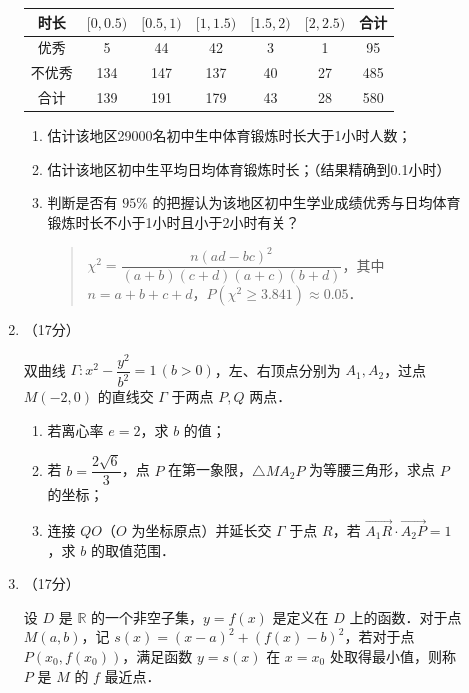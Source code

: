 \begin{description}
\begin{enumerate}[leftmargin=5pt]
        {\centering\begin{tabular}{c|c|c|c|c|c|c}
        \hline
        时长 & $[0,0.5)$ & $[0.5,1)$ & $[1,1.5)$ & $[1.5,2)$ & $[2,2.5)$ & 合计 \\
        \hline
        优秀 & 5 & 44 & 42 & 3 & 1 & 95 \\
        \hline
        不优秀 & 134 & 147 & 137 & 40 & 27 & 485 \\
        \hline
        合计 & 139 & 191 & 179 & 43 & 28 & 580 \\
        \hline
        \end{tabular}\par}

        \begin{enumerate}[label=(\arabic*)]
            \item 估计该地区29000名初中生中体育锻炼时长大于1小时人数；
            \item 估计该地区初中生平均日均体育锻炼时长；（结果精确到0.1小时）
            \item 判断是否有 $95\%$ 的把握认为该地区初中生学业成绩优秀与日均体育锻炼时长不小于1小时且小于2小时有关？
            
            \begin{quote}
            $\chi^2=\dfrac{n(ad-bc)^2}{(a+b)(c+d)(a+c)(b+d)}$，其中 $n=a+b+c+d$，$P(\chi^2\geqslant3.841)\approx0.05$．
            \end{quote}
        \end{enumerate}

        \item （17分）

        双曲线 $\Gamma:x^2-\dfrac{y^2}{b^2}=1\,(b>0)$，左、右顶点分别为 $A_1,A_2$，过点 $M(-2,0)$ 的直线交 $\Gamma$ 于两点 $P,Q$ 两点．

        \begin{enumerate}[label=(\arabic*)]
            \item 若离心率 $e=2$，求 $b$ 的值；
            \item 若 $b=\dfrac{2\sqrt{6}}{3}$，点 $P$ 在第一象限，$\triangle MA_2P$ 为等腰三角形，求点 $P$ 的坐标；
            \item 连接 $QO$（$O$ 为坐标原点）并延长交 $\Gamma$ 于点 $R$，若 $\overrightarrow{A_1R}\cdot\overrightarrow{A_2P}=1$，求 $b$ 的取值范围．
        \end{enumerate}

        \item （17分）

        设 $D$ 是 $\mathbb{R}$ 的一个非空子集，$y=f(x)$ 是定义在 $D$ 上的函数．对于点 $M(a,b)$，记 $s(x)=(x-a)^2+(f(x)-b)^2$，若对于点 $P(x_0,f(x_0))$，满足函数 $y=s(x)$ 在 $x=x_0$ 处取得最小值，则称 $P$ 是 $M$ 的 $f$ 最近点．


\end{enumerate}
\end{description}
